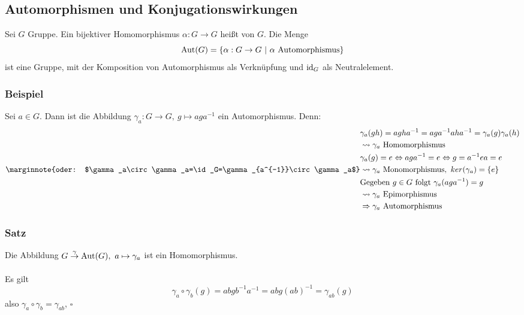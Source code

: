 
\subsection{Automorphismen und Konjugationswirkungen}
\label{sub:automor}
Sei $G$ Gruppe. Ein bijektiver Homomorphismus $\alpha:G\to G$ heißt  von $G$. Die Menge \[\operatorname{Aut}(G)=\{\alpha:G\to G~|~\alpha \text{ Automorphismus}\} \] 
ist eine Gruppe, mit der Komposition von Automorphismus als Verknüpfung und $\operatorname{id}_G$ als Neutralelement.

\subsubsection*{Beispiel}
Sei $a\in G$. Dann ist die Abbildung $\gamma_a:G\to G,~g\mapsto aga^{-1}$ ein Automorphismus. Denn:
\begin{equation*}
\begin{aligned}
	&\gamma_a(gh)=agha^{-1}=aga^{-1}aha^{-1}=\gamma_a(g)\gamma_a(h)\\
	&\rightsquigarrow \gamma_a \text{ Homomorphismus}\\
	&\gamma_a(g)=e \Leftrightarrow aga^{-1}=e \Leftrightarrow g=a^{-1}ea=e\\
	\marginnote{oder: $\gamma_a\circ\gamma_a=\id_G=\gamma_{a^{-1}}\circ\gamma_a$}
	&\rightsquigarrow \gamma_a \text{ Monomorphismus},~ker(\gamma_a)=\{e\}\\
	&\text{Gegeben } g\in G \text{ folgt } \gamma_a(aga^{-1})=g\\
	&\rightsquigarrow \gamma_a \text{ Epimorphismus}\\
	&\Rightarrow \gamma_a \text{ Automorphismus}
\end{aligned}
\end{equation*}

\subsubsection*{Satz}
Die Abbildung $G\stackrel{\gamma}{\to} \operatorname{Aut}(G),~a\mapsto \gamma_a$ ist ein Homomorphismus.\\

\\
Es gilt \[\gamma_a\circ\gamma_b(g)=abgb^{-1}a^{-1}=abg(ab)^{-1}=\gamma_{ab}(g) \]
also $\gamma_a\circ\gamma_b=\gamma_{ab}$,
\hfill $\square$\\

